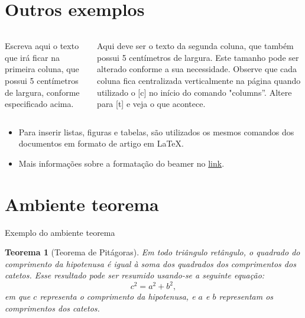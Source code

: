 \documentclass[aspectratio=169]{beamer}
\newtheorem{teo}{Teorema}[section]
\begin{document}
\section{Outros exemplos}
\begin{frame}{\insertsection}
    \begin{columns}[c]
        \begin{column}{5cm}
            Escreva aqui o texto que irá ficar na primeira coluna, que possui 5 centímetros de largura, conforme especificado acima. 
        \end{column}

        \begin{column}{5cm}
           Aqui deve ser o texto da segunda coluna, que também possui 5 centímetros de largura. Este tamanho pode ser alterado conforme a sua necessidade. Observe que cada coluna fica centralizada verticalmente na página quando utilizado o [c] no início do comando "columns''. Altere para [t] e veja o que acontece.
        \end{column}
    \end{columns}
\end{frame}

\begin{frame}{\insertsection}
    \begin{itemize}
        \item Para inserir listas, figuras e tabelas, são utilizados os mesmos comandos dos documentos em formato de artigo em \LaTeX. 
        \item Mais informações sobre a formatação do beamer no \href{http://www.telecom.uff.br/pet/petws/downloads/tutoriais/beamer/tut_beamer_2k100205.pdf}{link}.
    \end{itemize}
\end{frame}

\section{Ambiente teorema}
\begin{frame}{Exemplo do ambiente teorema}
    \begin{teo}[Teorema de Pitágoras]
    \label{theo:Pitagoras}
    Em todo triângulo retângulo, o quadrado do comprimento da hipotenusa é igual à soma dos quadrados dos comprimentos dos catetos. Esse resultado pode ser resumido usando-se a seguinte equação:
    \[c^2=a^2+b^2,\]
    em que $c$ representa o comprimento da hipotenusa, e $a$ e $b$ representam os comprimentos dos catetos.
    \end{teo}
\end{frame}
\end{document}
